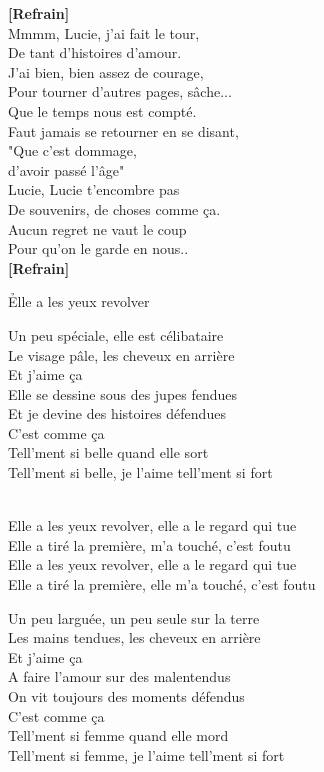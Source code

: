 \documentclass{novel}
\begin{document}
\begin{multicols}{2}
\textbf{[Refrain]}\\

Mmmm, Lucie, j'ai fait le tour, \\
De tant d'histoires d'amour. \\
J'ai bien, bien assez de courage, \\
Pour tourner d'autres pages, sâche... \\

Que le temps nous est compté. \\
Faut jamais se retourner en se disant, \\
"Que c'est dommage, \\
d'avoir passé l'âge" \\

Lucie, Lucie t'encombre pas \\
De souvenirs, de choses comme ça. \\
Aucun regret ne vaut le coup \\
Pour qu'on le garde en nous.. \\

\textbf{[Refrain]}\\
\end{multicols}

\newpage
\normalsize
\h*{Elle a les yeux revolver}

Un peu spéciale, elle est célibataire \\
Le visage pâle, les cheveux en arrière \\
Et j'aime ça \\
Elle se dessine sous des jupes fendues \\
Et je devine des histoires défendues \\
C'est comme ça \\
Tell'ment si belle quand elle sort \\
Tell'ment si belle, je l'aime tell'ment si fort \\

\begin{bfseries}
[Refrain:]\\
Elle a les yeux revolver, elle a le regard qui tue \\
Elle a tiré la première, m'a touché, c'est foutu \\
Elle a les yeux revolver, elle a le regard qui tue \\
Elle a tiré la première, elle m'a touché, c'est foutu \\
\end{bfseries}

Un peu larguée, un peu seule sur la terre \\
Les mains tendues, les cheveux en arrière \\
Et j'aime ça \\
A faire l'amour sur des malentendus \\
On vit toujours des moments défendus \\
C'est comme ça \\
Tell'ment si femme quand elle mord \\
Tell'ment si femme, je l'aime tell'ment si fort \\
\end{document}

